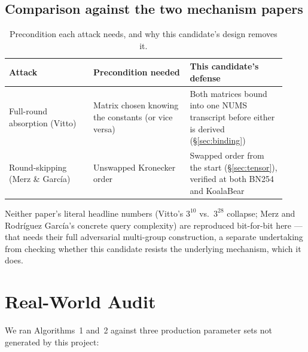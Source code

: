 \documentclass[11pt]{article}
\begin{document}
\subsection{Comparison against the two mechanism papers}

\begin{table}[h!]
\centering
\caption{Precondition each attack needs, and why this candidate's design removes it.}
\label{tab:comparison}
\small
\begin{tabular}{@{}p{0.28\linewidth}p{0.32\linewidth}p{0.32\linewidth}@{}}
\toprule
Attack & Precondition needed & This candidate's defense \\
\midrule
Full-round absorption (Vitto) & Matrix chosen knowing the constants (or vice versa) & Both matrices bound into one NUMS transcript before either is derived (\S\ref{sec:binding}) \\
Round-skipping (Merz \& Garc\'ia) & Unswapped Kronecker order & Swapped order from the start (\S\ref{sec:tensor}), verified at both BN254 and KoalaBear \\
\bottomrule
\end{tabular}
\end{table}

Neither paper's literal headline numbers (Vitto's $3^{10}$ vs.\ $3^{28}$
collapse; Merz and Rodr\'iguez Garc\'ia's concrete query complexity) are
reproduced bit-for-bit here --- that needs their full adversarial
multi-group construction, a separate undertaking from checking whether
this candidate resists the underlying mechanism, which it does.

\section{Real-World Audit}

We ran Algorithms~1 and~2 against three production parameter sets not
generated by this project:
\end{document}
